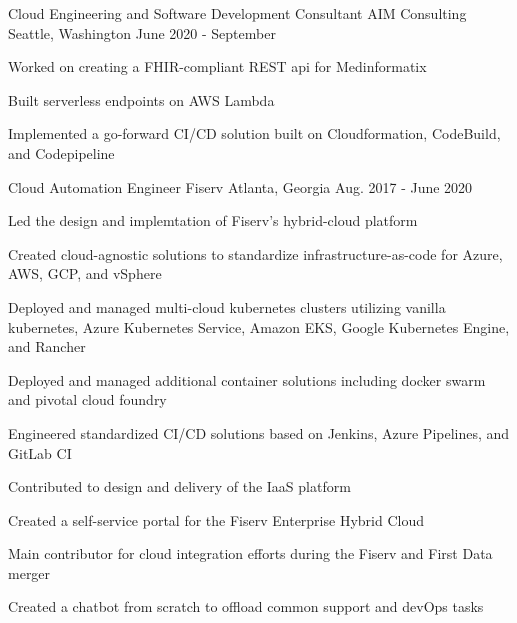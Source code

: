 \begin{cventries}

\cventry
{Cloud Engineering and Software Development Consultant} %
{AIM Consulting} %
{Seattle, Washington} %
{June 2020 - September} %
{ %
\begin{cvitems}
\item {Worked on creating a FHIR-compliant REST api for Medinformatix}
\item {Built serverless endpoints on AWS Lambda}
\item {Implemented a go-forward CI/CD solution built on Cloudformation, CodeBuild, and Codepipeline}
\end{cvitems}
}


\cventry
{Cloud Automation Engineer} %
{Fiserv} %
{Atlanta, Georgia} %
{Aug. 2017 - June 2020} %
{ %
\begin{cvitems}
\item {Led the design and implemtation of Fiserv's hybrid-cloud platform}
\item {Created cloud-agnostic solutions to standardize infrastructure-as-code for Azure, AWS, GCP, and vSphere}
\item {Deployed and managed multi-cloud kubernetes clusters utilizing vanilla kubernetes, Azure Kubernetes Service, Amazon EKS, Google Kubernetes Engine, and Rancher}
\item {Deployed and managed additional container solutions including docker swarm and pivotal cloud foundry}
\item {Engineered standardized CI/CD solutions based on Jenkins, Azure Pipelines, and GitLab CI}
\item {Contributed to design and delivery of the IaaS platform}
\item {Created a self-service portal for the Fiserv Enterprise Hybrid Cloud}
\item {Main contributor for cloud integration efforts during the Fiserv and First Data merger}
\item {Created a chatbot from scratch to offload common support and devOps tasks}
\end{cvitems}
}



\end{cventries}
